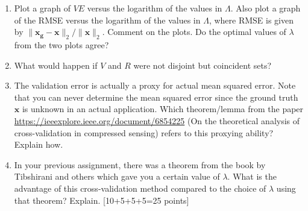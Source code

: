 \documentclass[11pt]{article}
\begin{document}
\begin{enumerate}
\begin{enumerate}
\item Plot a graph of $VE$ versus the logarithm of the values in $\Lambda$.  Also plot a graph of the RMSE versus the logarithm of the values in $\Lambda$, where RMSE is given by $\|\boldsymbol{x_g} - \boldsymbol{x}\|_2 / \|\boldsymbol{x}\|_2$. Comment on the plots. Do the optimal values of $\lambda$ from the two plots agree?
\item What would happen if $V$ and $R$ were not disjoint but coincident sets? 
\item The validation error is actually a proxy for actual mean squared error. Note that you can never determine the mean squared error since the ground truth $\boldsymbol{x}$ is unknown in an actual application. Which theorem/lemma from the paper \url{https://ieeexplore.ieee.org/document/6854225} (On the theoretical analysis of cross-validation in compressed sensing) refers to this proxying ability? Explain how.  
\item In your previous assignment, there was a theorem from the book by Tibshirani and others which gave you a certain value of $\lambda$. What is the advantage of this cross-validation method compared to the choice of $\lambda$ using that theorem? Explain.
\textsf{[10+5+5+5=25 points]}
\end{enumerate}



\end{enumerate}
\end{document}
